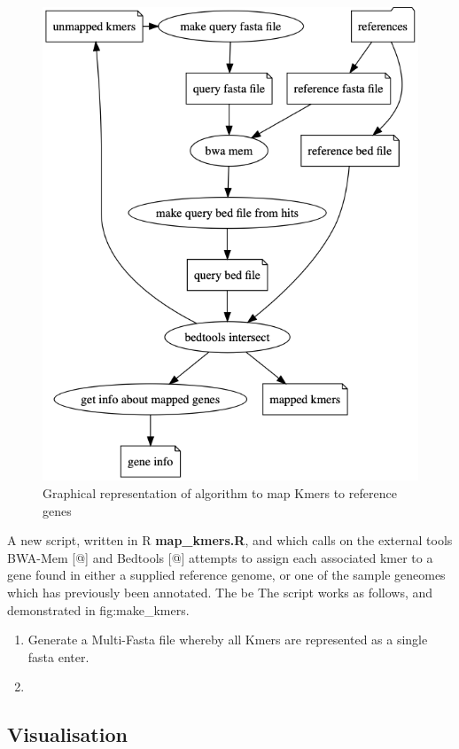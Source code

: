 \documentclass[]{article}
\begin{document}
\begin{figure}
\centering
\includegraphics{_static/map_kmers.png}
\caption{\label{fig:make_kmers}Graphical representation of algorithm to
map Kmers to reference genes}
\end{figure}

A new script, written in R \textbf{map\_kmers.R}, and which calls on the
external tools BWA-Mem {[}@{]} and Bedtools {[}@{]} attempts to assign
each associated kmer to a gene found in either a supplied reference
genome, or one of the sample geneomes which has previously been
annotated. The be The script works as follows, and demonstrated in
fig:make\_kmers.

\begin{enumerate}
\def\labelenumi{\arabic{enumi}.}
\item
  Generate a Multi-Fasta file whereby all Kmers are represented as a
  single fasta enter.
\item
\end{enumerate}

\hypertarget{visualisation}{%
\subsection{Visualisation}\label{visualisation}}
\end{document}
